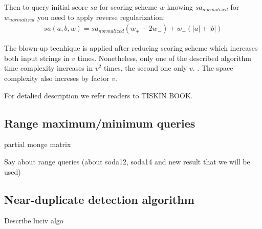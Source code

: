 Then to query initial score $sa$ for scoring scheme $w$
knowing $sa_{normalized}$ for $w_{normalized}$ you need to apply reverse regularization:
\begin{equation}
    \begin{aligned}
    sa(a,b,w) = sa_{normalized}  (w_{+} - 2w_{-}) +  w_{-} (|a| + |b|)
\end{aligned}
\end{equation}

The blown-up tecnhique is applied after reducing scoring scheme
which increases both input strings in $v$ times.
Nonetheless, only one of the described algorithm time complexity increases in $v^{2}$ times, the second one only $v$. .
The space complexity also increses by factor $v$. 


For detalied description we refer readers to TISKIN BOOK\cite{}.

 
\subsection{Range maximum/minimum queries}


partial monge matrix

Say about range queries (about soda12, soda14 and new result that we will be used)

\subsection{Near-duplicate detection algorithm}

Describe luciv algo

